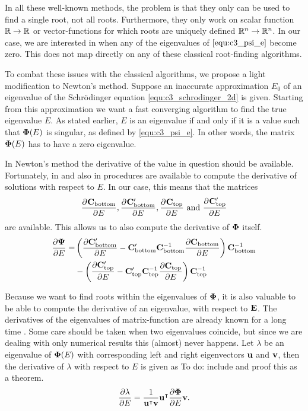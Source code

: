 In all these well-known methods, the problem is that they only can be used to find a single root, not all roots. Furthermore, they only work on scalar function $\mathbb{R} \to \mathbb{R}$ or vector-functions for which roots are uniquely defined $\mathbb{R}^n \to \mathbb{R}^n$. In our case, we are interested in when any of the eigenvalues of $\eqref{equ:c3_psi_e}$ become zero. This does not map directly on any of these classical root-finding algorithms.

To combat these issues with the classical algorithms, we propose a light modification to Newton's method. Suppose an inaccurate approximation $E_0$ of an eigenvalue of the Schrödinger equation \eqref{equ:c3_schrodinger_2d} is given. Starting from this approximation we want a fast converging algorithm to find the true eigenvalue $E$. As stated earlier, $E$ is an eigenvalue if and only if it is a value such that $\vb{\Phi}(E)$ is singular, as defined by \eqref{equ:c3_psi_e}. In other words, the matrix $\vb{\Phi}(E)$ has to have a zero eigenvalue.

In Newton's method the derivative of the value in question should be available. Fortunately, in \cite{ixaru_lilix_2002} and also in \cite{ledoux_cpmp_2006} procedures are available to compute the derivative of solutions with respect to $E$. In our case, this means that the matrices
$$
    \pdv[]{\vb{C}_\text{bottom}}{E}, \pdv[]{\vb{C}_\text{bottom}'}{E}, \pdv[]{\vb{C}_\text{top}}{E} \text{ and } \pdv[]{\vb{C}_\text{top}'}{E}
$$
are available. This allows us to also compute the derivative of $\vb{\Phi}$ itself.
\begin{align*}
    \pdv{\vb{\Psi}}{E} = & \left(\pdv{\vb{C}_\text{bottom}'}{E} - \vb{C}_\text{bottom}'\vb{C}_\text{bottom}^{-1}\pdv{\vb{C}_\text{bottom}}{E}\right) \vb{C}_\text{bottom}^{-1} \\
                         & - \left(\pdv{\vb{C}_\text{top}'}{E} - \vb{C}_\text{top}'\vb{C}_\text{top}^{-1}\pdv{\vb{C}_\text{top}}{E}\right) \vb{C}_\text{top}^{-1}
\end{align*}

Because we want to find roots within the eigenvalues of $\vb{\Phi}$, it is also valuable to be able to compute the derivative of an eigenvalue, with respect to $\vb{E}$. The derivatives of the eigenvalues of matrix-function are already known for a long time \cite{lancaster_eigenvalues_1964}. Some care should be taken when two eigenvalues coincide, but since we are dealing with only numerical results this (almost) never happens. Let $\lambda$ be an eigenvalue of $\vb{\Phi}(E)$ with corresponding left and right eigenvectors $\vb{u}$ and $\vb{v}$, then the derivative of $\lambda$ with respect to $E$ is given as {\color{red} To do: include and proof this as a theorem.}
$$
    \pdv{\lambda}{E} = \frac{1}{{\vb{u}}^\intercal\vb{v}}{\vb{u}}^\intercal \pdv{\vb{\Phi}}{E} \vb{v} \text{.}
$$

